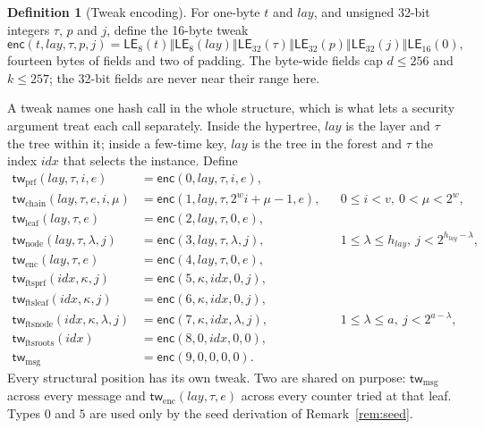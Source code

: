 \documentclass[11pt]{article}
\theoremstyle{definition}
\newtheorem{definition}{Definition}[section]
\theoremstyle{plain}
\theoremstyle{remark}
\newcommand{\LE}{\mathsf{LE}}
\newcommand{\concat}{\mathbin\Vert}
\newcommand{\idx}{\mathit{idx}}
\newcommand{\lay}{\mathit{lay}}
\begin{document}
\begin{definition}[Tweak encoding]
For one-byte $t$ and $\lay$, and unsigned 32-bit integers $\tau$, $p$ and $j$, define the 16-byte tweak
\[
  \mathsf{enc}(t,\lay,\tau,p,j)=\LE_8(t)\concat\LE_8(\lay)\concat\LE_{32}(\tau)\concat\LE_{32}(p)\concat\LE_{32}(j)\concat\LE_{16}(0),
\]
fourteen bytes of fields and two of padding. The byte-wide fields cap $d\leq256$ and $k\leq257$; the 32-bit fields are never near their range here.
\end{definition}

A tweak names one hash call in the whole structure, which is what lets a security argument treat each call separately. Inside the hypertree, $\lay$ is the layer and $\tau$ the tree within it; inside a few-time key, $\lay$ is the tree in the forest and $\tau$ the index $\idx$ that selects the instance. Define
\[
\begin{aligned}
  \mathsf{tw}_{\mathrm{prf}}(\lay,\tau,i,e) &= \mathsf{enc}(0,\lay,\tau,i,e),\\
  \mathsf{tw}_{\mathrm{chain}}(\lay,\tau,e,i,\mu) &= \mathsf{enc}(1,\lay,\tau,2^wi+\mu-1,e), &&0\leq i<v,\ 0<\mu<2^w,\\
  \mathsf{tw}_{\mathrm{leaf}}(\lay,\tau,e) &= \mathsf{enc}(2,\lay,\tau,0,e),\\
  \mathsf{tw}_{\mathrm{node}}(\lay,\tau,\lambda,j) &= \mathsf{enc}(3,\lay,\tau,\lambda,j), &&1\leq\lambda\leq h_\lay,\ j<2^{h_\lay-\lambda},\\
  \mathsf{tw}_{\mathrm{enc}}(\lay,\tau,e) &= \mathsf{enc}(4,\lay,\tau,0,e),\\
  \mathsf{tw}_{\mathrm{ftsprf}}(\idx,\kappa,j) &= \mathsf{enc}(5,\kappa,\idx,0,j),\\
  \mathsf{tw}_{\mathrm{ftsleaf}}(\idx,\kappa,j) &= \mathsf{enc}(6,\kappa,\idx,0,j),\\
  \mathsf{tw}_{\mathrm{ftsnode}}(\idx,\kappa,\lambda,j) &= \mathsf{enc}(7,\kappa,\idx,\lambda,j), &&1\leq\lambda\leq a,\ j<2^{a-\lambda},\\
  \mathsf{tw}_{\mathrm{ftsroots}}(\idx) &= \mathsf{enc}(8,0,\idx,0,0),\\
  \mathsf{tw}_{\mathrm{msg}} &= \mathsf{enc}(9,0,0,0,0).
\end{aligned}
\]
Every structural position has its own tweak. Two are shared on purpose: $\mathsf{tw}_{\mathrm{msg}}$ across every message and $\mathsf{tw}_{\mathrm{enc}}(\lay,\tau,e)$ across every counter tried at that leaf. Types $0$ and $5$ are used only by the seed derivation of Remark~\ref{rem:seed}.
\end{document}
